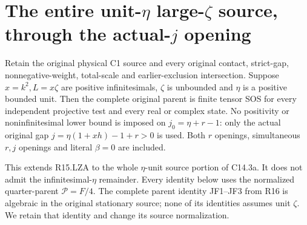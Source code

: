 \section{The entire unit-$\eta$ large-$\zeta$ source, through the actual-$j$ opening}
\label{sec:r17-lz-unit-eta}

\begin{theorem}
Retain the original physical C1 source and every original contact,
strict-gap, nonnegative-weight, total-scale and earlier-exclusion
intersection. Suppose $x=k^2,L=x\zeta$ are positive infinitesimals,
$\zeta$ is unbounded and $\eta$ is a positive bounded unit.
Then the complete original parent is finite tensor SOS for every
independent projective test and every real or complex state.
No positivity or noninfinitesimal lower bound is imposed on
$j_0=\eta+r-1$: only the actual original gap
$j=\eta(1+xh)-1+r>0$ is used. Both $r$ openings, simultaneous
$r,j$ openings and literal $\beta=0$ are included.
\end{theorem}

This extends R15.LZA to the whole $\eta$-unit source portion of
C14.3a. It does not admit the infinitesimal-$\eta$ remainder.
Every identity below uses the normalized quarter-parent $\mathcal P=F/4$.
The complete parent identity JF1--JF3 from R16 is algebraic in the
original stationary source; none of its identities assumes unit
$\zeta$. We retain that identity and change its source normalization.

